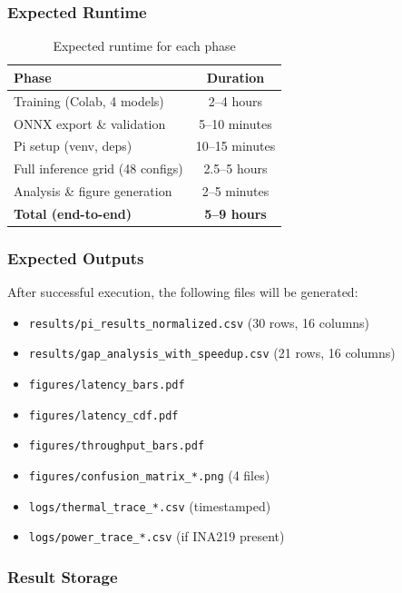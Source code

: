 \documentclass[review]{elsarticle}
\begin{document}
\subsubsection{Expected Runtime}

\begin{table}[h]
\centering
\caption{Expected runtime for each phase}
\label{tab:runtime}
\begin{tabular}{lc}
\toprule
\textbf{Phase} & \textbf{Duration} \\
\midrule
Training (Colab, 4 models) & 2--4 hours \\
ONNX export \& validation & 5--10 minutes \\
Pi setup (venv, deps) & 10--15 minutes \\
Full inference grid (48 configs) & 2.5--5 hours \\
Analysis \& figure generation & 2--5 minutes \\
\midrule
\textbf{Total (end-to-end)} & \textbf{5--9 hours} \\
\bottomrule
\end{tabular}
\end{table}

\subsubsection{Expected Outputs}

After successful execution, the following files will be generated:

\begin{itemize}
\item \texttt{results/pi\_results\_normalized.csv} (30 rows, 16 columns)
\item \texttt{results/gap\_analysis\_with\_speedup.csv} (21 rows, 16 columns)
\item \texttt{figures/latency\_bars.pdf}
\item \texttt{figures/latency\_cdf.pdf}
\item \texttt{figures/throughput\_bars.pdf}
\item \texttt{figures/confusion\_matrix\_*.png} (4 files)
\item \texttt{logs/thermal\_trace\_*.csv} (timestamped)
\item \texttt{logs/power\_trace\_*.csv} (if INA219 present)
\end{itemize}

\subsubsection{Result Storage}
\end{document}
